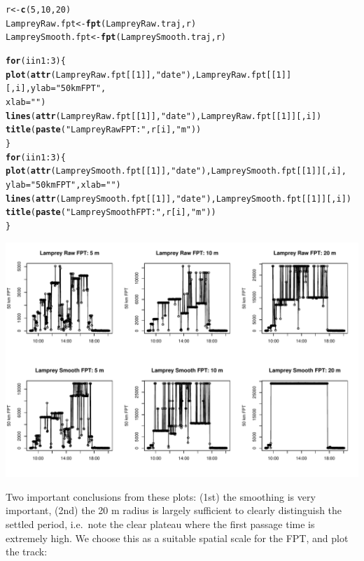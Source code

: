 \documentclass[10pt]{article}\usepackage{graphicx, color}
\makeatletter
\newcommand{\hlfunctioncall}[1]{\textcolor[rgb]{0.501960784313725,0,0.329411764705882}{\textbf{#1}}}%
\newcommand{\hlstring}[1]{\textcolor[rgb]{0.6,0.6,1}{#1}}%
\newenvironment{kframe}{%
 \def\at@end@of@kframe{}%
 \ifinner\ifhmode%
  \def\at@end@of@kframe{\end{minipage}}%
  \begin{minipage}{\columnwidth}%
 \fi\fi%
 \def\FrameCommand##1{\hskip\@totalleftmargin \hskip-\fboxsep
 \colorbox{shadecolor}{##1}\hskip-\fboxsep
     \hskip-\linewidth \hskip-\@totalleftmargin \hskip\columnwidth}%
 \MakeFramed {\advance\hsize-\width
   \@totalleftmargin\z@ \linewidth\hsize
   \@setminipage}}%
 {\par\unskip\endMakeFramed%
 \at@end@of@kframe}
\newenvironment{knitrout}{}{} %
\makeatother
\begin{document}
\begin{knitrout}\small
{}\color{fgcolor}\begin{kframe}
\begin{alltt}
r <- \hlfunctioncall{c}(5, 10, 20)
LampreyRaw.fpt <- \hlfunctioncall{fpt}(LampreyRaw.traj, r)
LampreySmooth.fpt <- \hlfunctioncall{fpt}(LampreySmooth.traj, r)

\hlfunctioncall{for} (i in 1:3) \{
    \hlfunctioncall{plot}(\hlfunctioncall{attr}(LampreyRaw.fpt[[1]], \hlstring{"date"}), LampreyRaw.fpt[[1]][, i], ylab = \hlstring{"50 km FPT"}, 
        xlab = \hlstring{""})
    \hlfunctioncall{lines}(\hlfunctioncall{attr}(LampreyRaw.fpt[[1]], \hlstring{"date"}), LampreyRaw.fpt[[1]][, i])
    \hlfunctioncall{title}(\hlfunctioncall{paste}(\hlstring{"Lamprey Raw FPT:"}, r[i], \hlstring{"m"}))
\}
\hlfunctioncall{for} (i in 1:3) \{
    \hlfunctioncall{plot}(\hlfunctioncall{attr}(LampreySmooth.fpt[[1]], \hlstring{"date"}), LampreySmooth.fpt[[1]][, i], 
        ylab = \hlstring{"50 km FPT"}, xlab = \hlstring{""})
    \hlfunctioncall{lines}(\hlfunctioncall{attr}(LampreySmooth.fpt[[1]], \hlstring{"date"}), LampreySmooth.fpt[[1]][, i])
    \hlfunctioncall{title}(\hlfunctioncall{paste}(\hlstring{"Lamprey Smooth FPT:"}, r[i], \hlstring{"m"}))
\}
\end{alltt}
\end{kframe}
\includegraphics[width=\textwidth]{figure/FPTexample} 

\end{knitrout}


Two important conclusions from these plots: (1st) the smoothing is very important, (2nd) the 20 m radius is largely sufficient to clearly distinguish the settled period, i.e.~note the clear plateau where the first passage time is extremely high. We choose this as a suitable spatial scale for the FPT, and plot the track:  
  
\end{document}
